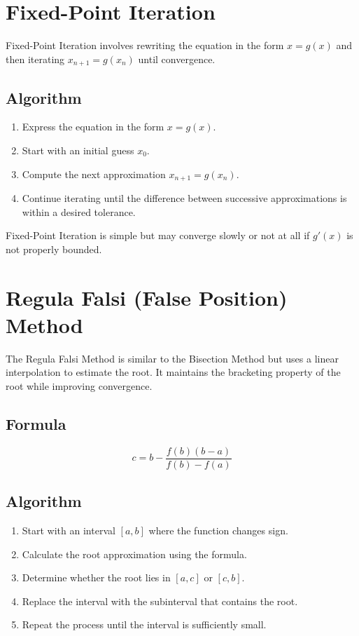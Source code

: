 \documentclass[12pt]{article}
\begin{document}
\section*{Fixed-Point Iteration}

Fixed-Point Iteration involves rewriting the equation in the form \( x = g(x) \) and then iterating \( x_{n+1} = g(x_n) \) until convergence.

\subsection*{Algorithm}
\begin{enumerate}
    \item Express the equation in the form \( x = g(x) \).
    \item Start with an initial guess \( x_0 \).
    \item Compute the next approximation \( x_{n+1} = g(x_n) \).
    \item Continue iterating until the difference between successive approximations is within a desired tolerance.
\end{enumerate}

Fixed-Point Iteration is simple but may converge slowly or not at all if \( g'(x) \) is not properly bounded.

\section*{Regula Falsi (False Position) Method}

The Regula Falsi Method is similar to the Bisection Method but uses a linear interpolation to estimate the root. It maintains the bracketing property of the root while improving convergence.

\subsection*{Formula}
\[
c = b - \frac{f(b)(b - a)}{f(b) - f(a)}
\]

\subsection*{Algorithm}
\begin{enumerate}
    \item Start with an interval \([a, b]\) where the function changes sign.
    \item Calculate the root approximation using the formula.
    \item Determine whether the root lies in \([a, c]\) or \([c, b]\).
    \item Replace the interval with the subinterval that contains the root.
    \item Repeat the process until the interval is sufficiently small.
\end{enumerate}
\end{document}
